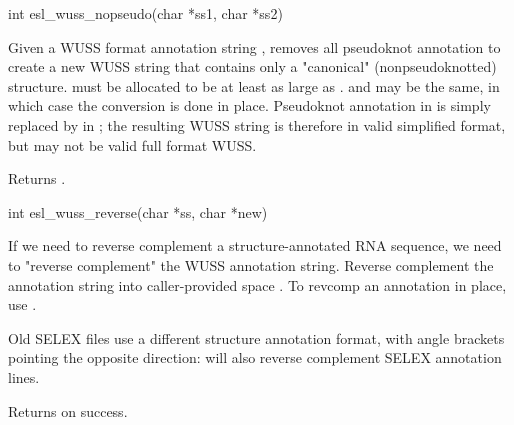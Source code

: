 \begin{sreapi}
\hypertarget{func:esl_wuss_nopseudo()}
{\item[int esl\_wuss\_nopseudo(char *ss1, char *ss2)]}

Given a WUSS format annotation string ,
removes all pseudoknot annotation to create a new 
WUSS string  that contains only a "canonical"
(nonpseudoknotted) structure.  must be allocated to
be at least as large as .  and 
may be the same, in which case the conversion is
done in place. Pseudoknot annotation in  is
simply replaced by  in ; the resulting
 WUSS string is therefore in valid simplified format,
but may not be valid full format WUSS.

Returns .


\hypertarget{func:esl_wuss_reverse()}
{\item[int esl\_wuss\_reverse(char *ss, char *new)]}

If we need to reverse complement a structure-annotated RNA
sequence, we need to "reverse complement" the WUSS
annotation string. Reverse complement the annotation string
 into caller-provided space . To revcomp an annotation 
in place, use .

Old SELEX files use a different structure annotation
format, with angle brackets pointing the opposite
direction:  will also reverse
complement SELEX annotation lines.

Returns  on success.


\end{sreapi}

